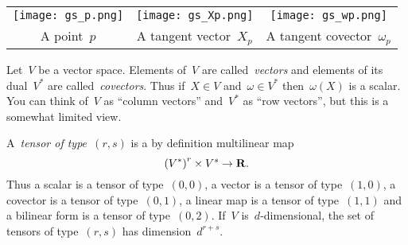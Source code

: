 


\begin{tabular}{ccc}
	\texttt{[image: gs\_p.png]} &
	\texttt{[image: gs\_Xp.png]} &
	\texttt{[image: gs\_wp.png]} \\
	A point~$p$ &
	A tangent vector~$X_p$ &
	A tangent covector~$\omega_p$
\end{tabular}

Let~$V$ be a vector space.  Elements of~$V$ are called~\emph{vectors} and
elements of its dual~$V^*$ are called~\emph{covectors}.
Thus if~$X\in V$ and~$\omega\in V^*$ then~$\omega(X)$ is a scalar.
You can think of~$V$ as ``column vectors'' and~$V^*$ as ``row vectors'', but
this is a somewhat limited view.

A~\emph{tensor of type~$(r,s)$} is a by definition multilinear map
\[
	\left(V^*\right)^r\times V^s\to\mathbf{R}.
\]
Thus a scalar is a tensor of type~$(0,0)$, a vector is a tensor of
type~$(1,0)$, a covector is a tensor of type~$(0,1)$, a linear map is a
tensor of type~$(1,1)$ and a bilinear form is a tensor of type~$(0,2)$.
If~$V$ is~$d$-dimensional, the set of tensors of type~$(r,s)$ has
dimension~$d^{r+s}$.

